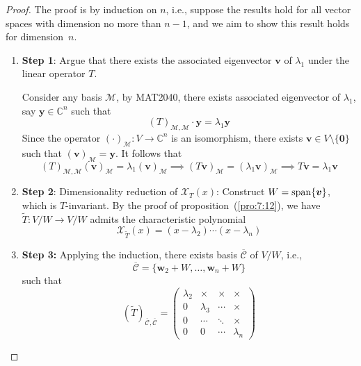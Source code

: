 \begin{proof}
The proof is by induction on $n$, i.e., suppose the results hold for all vector spaces with dimension no more than $n-1$, and we aim to show this result holds for dimension~$n$.
\begin{enumerate}
\item
\textbf{Step 1}:
Argue that there exists the associated eigenvector $\bm v$ of $\lambda_1$ under the linear operator $T$.

Consider any basis $\mathcal{M}$, by MAT2040, there exists associated eigenvector of $\lambda_1$, say $\bm y\in\mathbb{C}^n$ such that
\[
(T)_{\mathcal{M},\mathcal{M}}\cdot\bm y = \lambda_1\bm y
\]
Since the operator $(\cdot)_{\mathcal{M}}:V\to\mathbb{C}^n$ is an isomorphism, there exists $\bm v\in V\setminus\{\bm0\}$ such that $(\bm v)_{\mathcal{M}} = \bm y$. It follows that
\[
(T)_{\mathcal{M},\mathcal{M}}(\bm v)_{\mathcal{M}} = \lambda_1(\bm v)_{\mathcal{M}}\implies
(T\bm v)_{\mathcal{M}} = (\lambda_1\bm v)_{\mathcal{M}}\implies
T\bm v = \lambda_1\bm v
\]
\item
\textbf{Step 2}:
Dimensionality reduction of $\mathcal{X}_T(x)$:
Construct $W=\operatorname{span}\{\bm v\}$, which is $T$-invariant.
By the proof of proposition~(\ref{pro:7:12}), we have 
$\tilde{T}:V/W\to V/W$ admits the characteristic polynomial
\[
\mathcal{X}_{\tilde{T}}(x) = (x-\lambda_2)\cdots(x-\lambda_n)
\]
\item
\textbf{Step 3:}
Applying the induction, 
there exists basis $\overline{\mathcal{C}}$ of $V/W$, i.e.,
\[
\overline{\mathcal{C}} = \{\bm w_2+W,\dots,\bm w_n+W\}
\]
such that
\[
(\tilde{T})_{\overline{\mathcal{C}},\overline{\mathcal{C}}}
=
\begin{pmatrix}
\lambda_2&\times&\times&\times\\
0&\lambda_3&\cdots&\times\\
0&\cdots&\ddots&\times\\
0&0&\cdots&\lambda_n
\end{pmatrix}
\]
\end{enumerate}
\end{proof}
